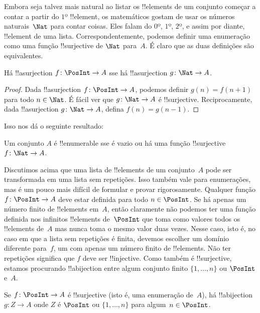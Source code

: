 \documentclass[../../../include/open-logic-section]{subfiles}
\begin{document}
Embora seja talvez mais natural ao listar os !!{element}s de um
conjunto começar a contar a partir do $1$º !!{element}, os matemáticos gostam
de usar os números naturais~$\Nat$ para contar coisas. Eles
falam do $0$º, $1$º, $2$º, e assim por diante, !!{element} de uma lista.
Correspondentemente, podemos definir uma enumeração como uma função
!!{surjective} de $\Nat$ para~$A$. É claro que as duas definições são
equivalentes.

\begin{prop}
  Há !!a{surjection} $f\colon \PosInt \to A$ sse há
  !!a{surjection} $g\colon \Nat \to A$.
\end{prop}

\begin{proof}
  Dada !!a{surjection} $f\colon \PosInt \to A$, podemos definir $g(n) =
  f(n+1)$ para todo $n \in \Nat$. É fácil ver que $g\colon \Nat
  \to A$ é !!{surjective}. Reciprocamente, dada !!a{surjection} $g\colon
  \Nat \to A$, defina $f(n) = g(n-1)$.
\end{proof}

Isso nos dá o seguinte resultado:

\begin{cor}
Um conjunto $A$ é !!{enumerable} sse é vazio ou há
uma função !!{surjective} $f\colon \Nat \to A$.
\end{cor}

Discutimos acima que uma lista de !!{element}s de um conjunto~$A$ pode ser
transformada em uma lista sem repetições. Isso também vale para
enumerações, mas é um pouco mais difícil de formular e provar rigorosamente. Qualquer
função $f\colon \PosInt \to A$ deve estar definida para todo $n \in
\PosInt$. Se há apenas um número finito de !!{element}s em~$A$, então claramente não podemos ter uma função definida nos infinitos
!!{element}s de~$\PosInt$ que toma como valores todos os !!{element}s
de~$A$ mas nunca toma o mesmo valor duas vezes. Nesse caso, isto é, no
caso em que a lista sem repetições é finita, devemos escolher
um domínio diferente para~$f$, um com apenas um número finito de !!{element}s.
Não ter repetições significa que $f$ deve ser !!{injective}. Como também é
!!{surjective}, estamos procurando !!a{bijection} entre algum
conjunto finito $\{1, \dots, n\}$ ou $\PosInt$ e~$A$.

\begin{prop}
Se $f\colon \PosInt \to A$ é !!{surjective} (isto é, uma enumeração
de~$A$), há !!a{bijection} $g\colon Z \to A$ onde $Z$ é
$\PosInt$ ou $\{1, \dots, n\}$ para algum~$n \in \PosInt$.
\end{prop}
\end{document}
